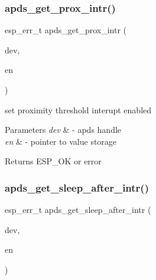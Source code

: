 \subsubsection{\texorpdfstring{apds\+\_\+get\+\_\+prox\+\_\+intr()}{apds\_get\_prox\_intr()}}
{\footnotesize\ttfamily esp\+\_\+err\+\_\+t apds\+\_\+get\+\_\+prox\+\_\+intr (\begin{DoxyParamCaption}\item[{\hyperlink{structAPDS9960__Driver}{A\+P\+D\+S\+\_\+\+D\+EV}}]{dev,  }\item[{\hyperlink{vl53l0x__types_8h_aba7bc1797add20fe3efdf37ced1182c5}{uint8\+\_\+t} $\ast$}]{en }\end{DoxyParamCaption})}




\begin{DoxyItemize}
\item set proximity threshold interupt enabled 
\end{DoxyItemize}


\begin{DoxyParams}{Parameters}
{\em dev} & -\/ apds handle \\
\hline
{\em en} & -\/ pointer to value storage \\
\hline
\end{DoxyParams}
\begin{DoxyReturn}{Returns}
E\+S\+P\+\_\+\+OK or error 
\end{DoxyReturn}
\mbox{\label{group__APDS9960__InterruptFunctions_gaaa0f806e72297961b367064be3dcefa4}} 
\subsubsection{\texorpdfstring{apds\+\_\+get\+\_\+sleep\+\_\+after\+\_\+intr()}{apds\_get\_sleep\_after\_intr()}}
{\footnotesize\ttfamily esp\+\_\+err\+\_\+t apds\+\_\+get\+\_\+sleep\+\_\+after\+\_\+intr (\begin{DoxyParamCaption}\item[{\hyperlink{structAPDS9960__Driver}{A\+P\+D\+S\+\_\+\+D\+EV}}]{dev,  }\item[{\hyperlink{vl53l0x__types_8h_aba7bc1797add20fe3efdf37ced1182c5}{uint8\+\_\+t} $\ast$}]{en }\end{DoxyParamCaption})}





